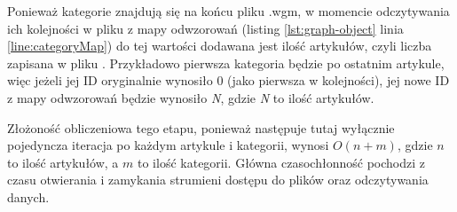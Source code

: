 Ponieważ kategorie znajdują się na końcu pliku .wgm, w momencie odczytywania ich kolejności w pliku  z mapy odwzorowań (listing \ref{lst:graph-object} linia \ref{line:categoryMap}) do tej wartości dodawana jest ilość artykułów, czyli liczba zapisana w pliku . Przykładowo pierwsza kategoria będzie po ostatnim artykule, więc jeżeli jej ID oryginalnie wynosiło 0 (jako pierwsza w kolejności), jej nowe ID z mapy odwzorowań będzie wynosiło \textit{N}, gdzie \textit{N} to ilość artykułów.

Złożoność obliczeniowa tego etapu, ponieważ następuje tutaj wyłącznie pojedyncza iteracja po każdym artykule i kategorii, wynosi $O(n+m)$, gdzie $n$ to ilość artykułów, a $m$ to ilość kategorii. Główna czasochłonność pochodzi z czasu otwierania i zamykania strumieni dostępu do plików oraz odczytywania danych.
